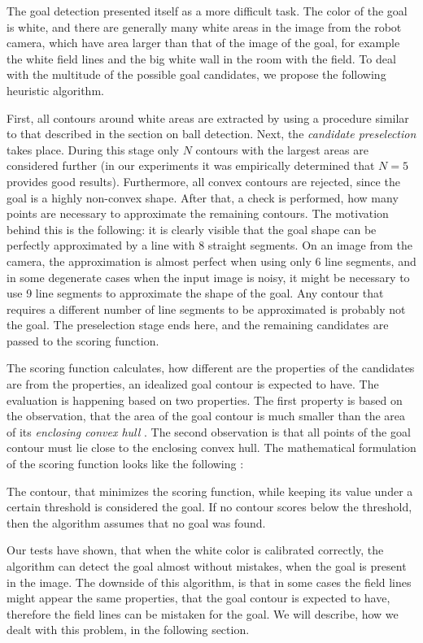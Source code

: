 The goal detection presented itself as a more difficult task. The color of the
goal is white, and there are generally many white areas in the image from the
robot camera, which have area larger than that of the image of the goal, for
example the white field lines and the big white wall in the room with the
field. To deal with the multitude of the possible goal candidates, we
propose the following heuristic algorithm.

First, all contours around white areas are extracted by using a procedure
similar to that described in the section on ball detection. Next, the
\textit{candidate preselection} takes place. During this stage only $N$
contours with the largest areas are considered further (in our experiments it
was empirically determined that $N=5$ provides good results). Furthermore, all
convex contours are rejected, since the goal is a highly non-convex shape.
After that, a check is performed, how many points are necessary to approximate
the remaining contours. The motivation behind this is the following: it is
clearly visible that the goal shape can be perfectly approximated by a line
with 8 straight segments. On an image from the camera, the approximation is
almost perfect when using only 6 line segments, and in some degenerate cases
when the input image is noisy, it might be necessary to use 9 line segments to
approximate the shape of the goal. Any contour that requires a different number
of line segments to be approximated is probably not the goal. The preselection
stage ends here, and the remaining candidates are passed to the scoring
function.

The scoring function calculates, how different are the properties of the
candidates are from the properties, an idealized goal contour is expected to
have. The evaluation is happening based on two properties. The first property
is based on the observation, that the area of the goal contour is much smaller
than the area of its \textit{enclosing convex hull} \cite{convex-hull}. The
second observation is that all points of the goal contour must lie close to the
enclosing convex hull. The mathematical formulation of the scoring function
looks like the following :

The contour, that minimizes the scoring function, while keeping its value under
a certain threshold is considered the goal. If no contour scores below the
threshold, then the algorithm assumes that no goal was found.

Our tests have shown, that when the white color is calibrated correctly, the
algorithm can detect the goal almost without mistakes, when the goal is present
in the image. The downside of this algorithm, is that in some cases the field
lines might appear the same properties, that the goal contour is expected to
have, therefore the field lines can be mistaken for the goal. We will describe,
how we dealt with this problem, in the following section.

